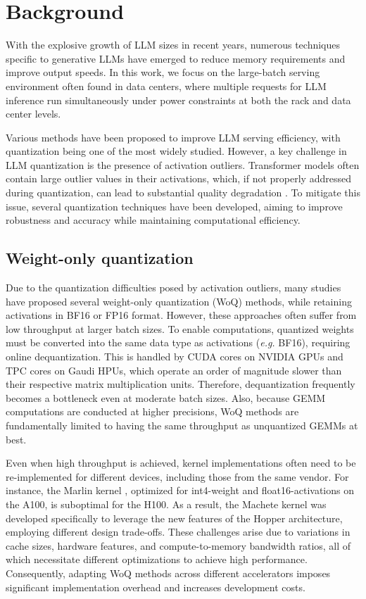 \section{Background}\label{sec:background}

With the explosive growth of LLM sizes in recent years, numerous techniques specific to generative LLMs have emerged to reduce memory requirements and improve output speeds. In this work, we focus on the large-batch serving environment often found in data centers, where multiple requests for LLM inference run simultaneously under power constraints at both the rack and data center levels.

Various methods have been proposed to improve LLM serving efficiency, with quantization being one of the most widely studied. However, a key challenge in LLM quantization is the presence of activation outliers.
Transformer models often contain large outlier values in their activations, which, if not properly addressed during quantization, can lead to substantial quality degradation \citep{sun2024massive}. To mitigate this issue, several quantization techniques have been developed, aiming to improve robustness and accuracy while maintaining computational efficiency.


\subsection{Weight-only quantization}
Due to the quantization difficulties posed by activation outliers, many studies have proposed several weight-only quantization (WoQ) methods\citep{MLSYS2024_42a452cb, frantar2023optq, flexround}, while retaining activations in BF16 or FP16 format.
However, these approaches often suffer from low throughput at larger batch sizes.
To enable computations, quantized weights must be converted into the same data type as activations (\textit{e.g.} BF16), requiring online dequantization. This is handled by CUDA cores on NVIDIA GPUs and TPC cores on Gaudi HPUs, which operate an order of magnitude slower than their respective matrix multiplication units. Therefore, dequantization frequently becomes a bottleneck even at moderate batch sizes. Also, because GEMM computations are conducted at higher precisions, WoQ methods are fundamentally limited to having the same throughput as unquantized GEMMs at best.

Even when high throughput is achieved, kernel implementations often need to be re-implemented for different devices, including those from the same vendor. 
For instance, the Marlin kernel \citep{frantar2024marlin}, optimized for int4-weight and float16-activations on the A100, is suboptimal for the H100. As a result, the Machete kernel \citep{machete} was developed specifically to leverage the new features of the Hopper architecture, employing different design trade-offs. 
These challenges arise due to variations in cache sizes, hardware features, and compute-to-memory bandwidth ratios, all of which necessitate different optimizations to achieve high performance. Consequently, adapting WoQ methods across different accelerators imposes significant implementation overhead and increases development costs.

